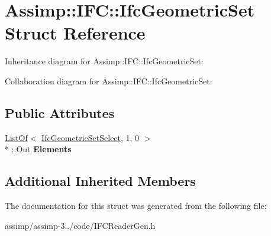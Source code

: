 \hypertarget{struct_assimp_1_1_i_f_c_1_1_ifc_geometric_set}{\section{Assimp\+:\+:I\+F\+C\+:\+:Ifc\+Geometric\+Set Struct Reference}
\label{struct_assimp_1_1_i_f_c_1_1_ifc_geometric_set}
}


Inheritance diagram for Assimp\+:\+:I\+F\+C\+:\+:Ifc\+Geometric\+Set\+:


Collaboration diagram for Assimp\+:\+:I\+F\+C\+:\+:Ifc\+Geometric\+Set\+:
\subsection*{Public Attributes}
\begin{DoxyCompactItemize}
\item 
\hypertarget{struct_assimp_1_1_i_f_c_1_1_ifc_geometric_set_a0577e508b3ee974d8a8e19eaf19af0e5}{\hyperlink{struct_assimp_1_1_s_t_e_p_1_1_list_of}{List\+Of}$<$ \hyperlink{class_assimp_1_1_s_t_e_p_1_1_e_x_p_r_e_s_s_1_1_data_type}{Ifc\+Geometric\+Set\+Select}, 1, 0 $>$\\*
\+::Out {\bfseries Elements}}\label{struct_assimp_1_1_i_f_c_1_1_ifc_geometric_set_a0577e508b3ee974d8a8e19eaf19af0e5}

\end{DoxyCompactItemize}
\subsection*{Additional Inherited Members}


The documentation for this struct was generated from the following file\+:\begin{DoxyCompactItemize}
\item 
assimp/assimp-\/3../code/I\+F\+C\+Reader\+Gen.\+h\end{DoxyCompactItemize}
